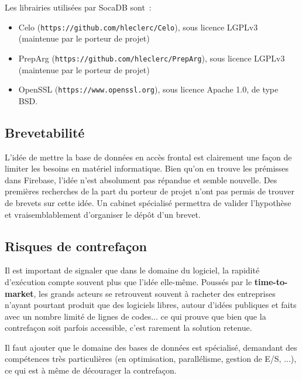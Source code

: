 \documentclass[a4paper,10pt]{scrreprt}
\begin{document}
            \medskip
            Les librairies utilisées par SocaDB sont~:
            \begin{itemize}
                \item Celo (\verb&https://github.com/hleclerc/Celo&), sous licence LGPLv3 (maintenue par le porteur de projet)
                \item PrepArg (\verb&https://github.com/hleclerc/PrepArg&), sous licence LGPLv3 (maintenue par le porteur de projet)
                \item OpenSSL (\verb&https://www.openssl.org&), sous licence Apache 1.0, de type BSD.
            \end{itemize}
        
        \subsection{Brevetabilité}

            L'idée de mettre la base de données en accès frontal est clairement une façon de limiter les besoins en matériel informatique. Bien qu'on en trouve les prémisses dans Firebase, l'idée n'est absolument pas répandue et semble nouvelle. Des premières recherches de la part du porteur de projet n'ont pas permis de trouver de brevets sur cette idée. Un cabinet spécialisé permettra de valider l'hypothèse et vraisemblablement d'organiser le dépôt d'un brevet.
        
        \subsection{Risques de contrefaçon}
        
            Il est important de signaler que dans le domaine du logiciel, la rapidité d'exécution compte souvent plus que l'idée elle-même. Poussés par le \textbf{time-to-market}, les grands acteurs se retrouvent souvent à racheter des entreprises n'ayant pourtant produit que des logiciels libres, autour d'idées publiques et faits avec un nombre limité de lignes de codes... ce qui prouve que bien que la contrefaçon soit parfois accessible, c'est rarement la solution retenue.
            
            Il faut ajouter que le domaine des bases de données est spécialisé, demandant des compétences très particulières (en optimisation, parallélisme, gestion de E/S, ...), ce qui est à même de décourager la contrefaçon.
            
\end{document}
